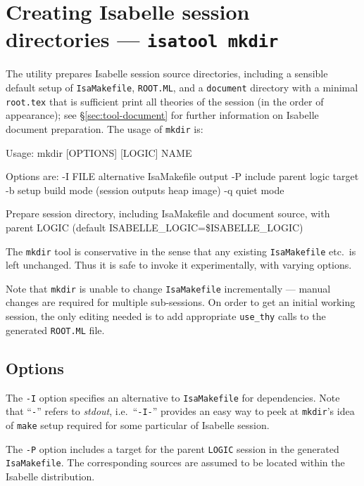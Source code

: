 \section{Creating Isabelle session directories --- \texttt{isatool mkdir}}
\label{sec:tool-mkdir}

The  utility prepares Isabelle session source directories,
including a sensible default setup of \texttt{IsaMakefile}, \texttt{ROOT.ML},
and a \texttt{document} directory with a minimal \texttt{root.tex} that is
sufficient print all theories of the session (in the order of appearance); see
\S\ref{sec:tool-document} for further information on Isabelle document
preparation.  The usage of \texttt{mkdir} is:
\begin{ttbox}
Usage: mkdir [OPTIONS] [LOGIC] NAME

  Options are:
    -I FILE      alternative IsaMakefile output
    -P           include parent logic target
    -b           setup build mode (session outputs heap image)
    -q           quiet mode

  Prepare session directory, including IsaMakefile and document source,
  with parent LOGIC (default ISABELLE_LOGIC=\$ISABELLE_LOGIC)
\end{ttbox}

The \texttt{mkdir} tool is conservative in the sense that any existing
\texttt{IsaMakefile} etc.\ is left unchanged.  Thus it is safe to invoke it
experimentally, with varying options.

Note that \texttt{mkdir} is unable to change \texttt{IsaMakefile}
incrementally --- manual changes are required for multiple sub-sessions.  On
order to get an initial working session, the only editing needed is to add
appropriate \texttt{use_thy} calls to the generated \texttt{ROOT.ML} file.


\subsection*{Options}

The \texttt{-I} option specifies an alternative to \texttt{IsaMakefile} for
dependencies.  Note that ``\texttt{-}'' refers to \emph{stdout}, i.e.\ 
``\texttt{-I-}'' provides an easy way to peek at \texttt{mkdir}'s idea of
\texttt{make} setup required for some particular of Isabelle session.

\medskip The \texttt{-P} option includes a target for the parent
\texttt{LOGIC} session in the generated \texttt{IsaMakefile}.  The
corresponding sources are assumed to be located within the Isabelle
distribution.

